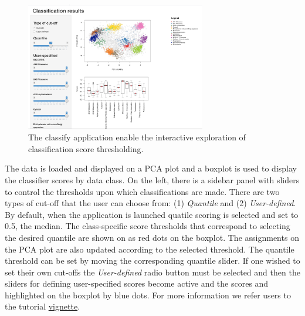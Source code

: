 \begin{knitrout}
\color{fgcolor}\begin{kframe}
\begin{alltt}
\hlstd{(}\hlstd{)}
  \hlstd{=} \hlstd{,}  \hlstd{=} \hlstd{,}  \hlstd{=} \hlstd{,}  \hlstd{=} \hlstd{)}
\end{alltt}
\end{kframe}
\end{knitrout}

\begin{figure}[!ht]
  \centering
  \includegraphics[width=0.7\textwidth]{./Figures/classify.png}
  \caption{The classify application enable the interactive exploration
    of classification score thresholding.}
  \label{fig:classifyapp}
\end{figure}


The data is loaded and displayed on a PCA plot and a boxplot is used
to display the classifier scores by data class. On the left, there is
a sidebar panel with sliders to control the thresholds upon which
classifications are made. There are two types of cut-off that the user
can choose from: (1) \textit{Quantile} and (2)
\textit{User-defined}. By default, when the application is launched
quatile scoring is selected and set to 0.5, the median. The
class-specific score thresholds that correspond to selecting the
desired quantile are shown on as red dots on the boxplot. The
assignments on the PCA plot are also updated according to the selected
threshold. The quantile threshold can be set by moving the
corresponding quantile slider. If one wished to set their own cut-offs
the \textit{User-defined} radio button must be selected and then the
sliders for defining user-specified scores become active and the
scores and highlighted on the boxplot by blue dots. For more
information we refer users to the  tutorial
\href{http://bioconductor.org/packages/release/bioc/vignettes/pRolocGUI/inst/doc/pRolocGUI.html}{vignette}.

